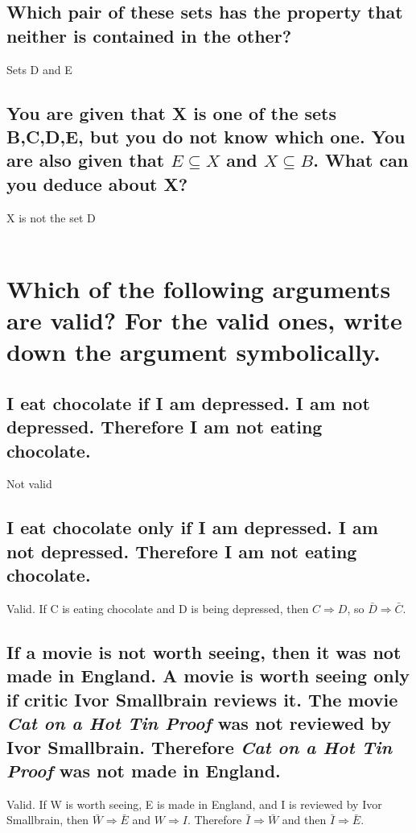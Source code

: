 \documentclass[12pt]{article}
\begin{document}
\subsection{Which pair of these sets has the property that neither is contained in the other?}
Sets D and E
\subsection{
    You are given that X is one of the sets B,C,D,E, but you do not know which one.
    You are also given that $E \subseteq X$ and $X \subseteq B$. What can you deduce about X?
}
X is not the set D\\\\

\section{
    Which of the following arguments are valid?
    For the valid ones, write down the argument symbolically.
}
\subsection{
    I eat chocolate if I am depressed.
    I am not depressed.
    Therefore I am not eating chocolate.
}
Not valid
\subsection{
    I eat chocolate only if I am depressed.
    I am not depressed.
    Therefore I am not eating chocolate.
}
Valid. If C is eating chocolate and D is being depressed, then $C \Rightarrow D$, so $\bar{D} \Rightarrow \bar{C}$.
\subsection{
    If a movie is not worth seeing, then it was not made in England.
    A movie is worth seeing only if critic Ivor Smallbrain reviews it.
    The movie \emph{Cat on a Hot Tin Proof} was not reviewed by Ivor Smallbrain.
    Therefore \emph{Cat on a Hot Tin Proof} was not made in England.
}
Valid. If W is worth seeing, E is made in England, and I is reviewed by Ivor Smallbrain, 
then $\bar{W} \Rightarrow \bar{E}$ and $W \Rightarrow I$.
Therefore $\bar{I} \Rightarrow \bar{W}$ and then $\bar{I} \Rightarrow \bar{E}$.
\end{document}
